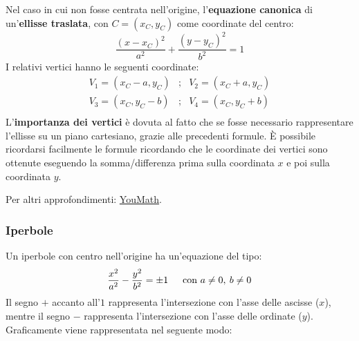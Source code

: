 \documentclass[a4paper]{article}
\begin{document}
	\noindent
	Nel caso in cui non fosse centrata nell'origine, l'\textbf{equazione canonica} di un'\textbf{ellisse traslata}, con $C=\left(x_{C}, y_{C}\right)$ come coordinate del centro:
	\begin{equation*}
		\dfrac{\left(x-x_{C}\right)^{2}}{a^{2}} + \dfrac{\left(y-y_{C}\right)^{2}}{b^{2}} = 1
	\end{equation*}
	I relativi vertici hanno le seguenti coordinate:
	\begin{equation*}
		\begin{array}{lcl}
			V_{1} = \left(x_{C}-a, y_{C}\right) &;& V_{2} = \left(x_{C}+a, y_{C}\right) \\
			V_{3} = \left(x_{C}, y_{C}-b\right) &;& V_{4} = \left(x_{C}, y_{C}+b\right) \\
		\end{array}
	\end{equation*}
	L'\textbf{importanza dei vertici} è dovuta al fatto che se fosse necessario rappresentare l'ellisse su un piano cartesiano, grazie alle precedenti formule. È possibile ricordarsi facilmente le formule ricordando che le coordinate dei vertici sono ottenute eseguendo la somma/differenza prima sulla coordinata $x$ e poi sulla coordinata $y$.\newline
	
	\noindent
	Per altri approfondimenti: \href{https://www.youmath.it/formulari/formulari-di-geometria-analitica/445-ellisse-nel-piano-cartesiano.html}{YouMath}.\newpage

	\subsubsection{Iperbole}\label{subsubsection: iperbole}

	Un iperbole con centro nell'origine ha un'equazione del tipo:
	\begin{equation*}
		\dfrac{x^{2}}{a^{2}} - \dfrac{y^{2}}{b^{2}} = \pm 1 \hspace{1.5em} \text{con } a \ne 0, \: b \ne 0
	\end{equation*}
	Il segno $+$ accanto all'$1$ rappresenta l'intersezione con l'asse delle ascisse ($x$), mentre il segno $-$ rappresenta l'intersezione con l'asse delle ordinate ($y$). Graficamente viene rappresentata nel seguente modo:\newline
\end{document}
